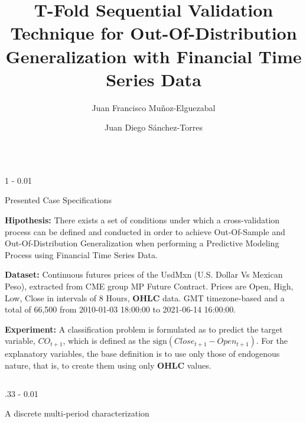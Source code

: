 \documentclass{postertheme}\usepackage[]{graphicx}\usepackage[]{color}
\title{T-Fold Sequential Validation Technique for Out-Of-Distribution Generalization with Financial
       Time Series Data}
\author {Juan Francisco Muñoz-Elguezabal \inst{1} \and Juan Diego Sánchez-Torres \inst{1}}
\institute {\inst{1} Western Institute of Technology and Higher Education (ITESO)}
\begin{document}
\begin{frame}


\begin{columns}[onlytextwidth]
  
  \begin{column}{1 \textwidth - 0.01 \textwidth}
    \begin{block}{Presented Case Specifications}

    \textbf{Hipothesis:}
      There exists a set of conditions under which a cross-validation process can be defined and conducted in
      order to achieve Out-Of-Sample and Out-Of-Distribution Generalization when performing a Predictive
      Modeling Process using Financial Time Series Data.
      
    \textbf{Dataset:}
      Continuous futures prices of the UsdMxn (U.S. Dollar Vs Mexican Peso),
      extracted from CME group MP Future Contract. Prices are Open, High, Low, Close
      in intervals of 8 Hours, \textbf{OHLC} data. GMT timezone-based and a total of 66,500 
      from 2010-01-03 18:00:00 to 2021-06-14 16:00:00.
    
    \textbf{Experiment:}
      A classification problem is formulated as to predict the target variable, $CO_{t+1}$, which is defined
      as the $\text{sign}(Close_{t+1} - Open_{t+1})$. For the explanatory variables, the base definition is to
      use only those of endogenous nature, that is, to create them using only \textbf{OHLC} values.
  
    \end{block}
  \end{column}
\end{columns}


\begin{columns}[onlytextwidth]
  
  \begin{column}{.33 \textwidth - 0.01 \textwidth}
    \begin{block}{A discrete multi-period characterization}
    

\end{block}
\end{column}
\end{columns}
\end{frame}
\end{document}
